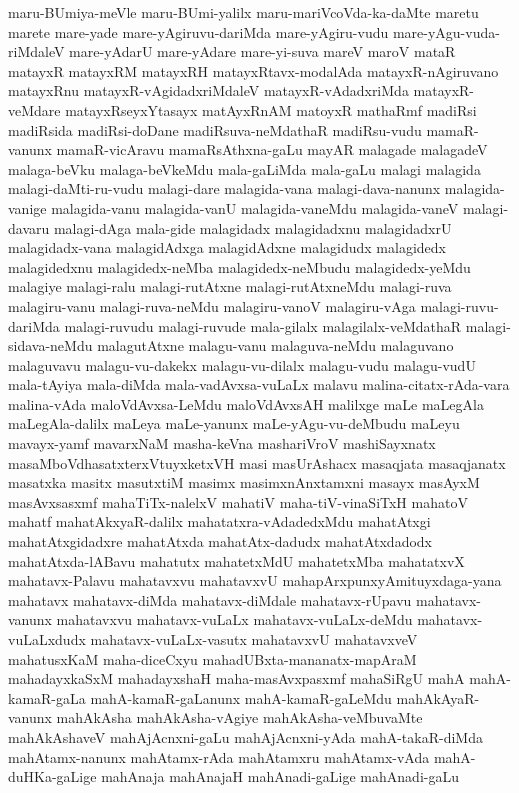 {maru-BUmiya-meVle
maru-BUmi-yalilx
maru-mariVcoVda-ka-daMte
maretu
marete
mare-yade
mare-yAgiruvu-dariMda
mare-yAgiru-vudu
mare-yAgu-vuda-riMdaleV
mare-yAdarU
mare-yAdare
mare-yi-suva
mareV
maroV
mataR
matayxR
matayxRM
matayxRH
matayxRtavx-modalAda
matayxR-nAgiruvano
matayxRnu
matayxR-vAgidadxriMdaleV
matayxR-vAdadxriMda
matayxR-veMdare
matayxRseyxYtasayx
matAyxRnAM
matoyxR
mathaRmf
madiRsi
madiRsida
madiRsi-doDane
madiRsuva-neMdathaR
madiRsu-vudu
mamaR-vanunx
mamaR-vicAravu
mamaRsAthxna-gaLu
mayAR
malagade
malagadeV
malaga-beVku
malaga-beVkeMdu
mala-gaLiMda
mala-gaLu
malagi
malagida
malagi-daMti-ru-vudu
malagi-dare
malagida-vana
malagi-dava-nanunx
malagida-vanige
malagida-vanu
malagida-vanU
malagida-vaneMdu
malagida-vaneV
malagi-davaru
malagi-dAga
mala-gide
malagidadx
malagidadxnu
malagidadxrU
malagidadx-vana
malagidAdxga
malagidAdxne
malagidudx
malagidedx
malagidedxnu
malagidedx-neMba
malagidedx-neMbudu
malagidedx-yeMdu
malagiye
malagi-ralu
malagi-rutAtxne
malagi-rutAtxneMdu
malagi-ruva
malagiru-vanu
malagi-ruva-neMdu
malagiru-vanoV
malagiru-vAga
malagi-ruvu-dariMda
malagi-ruvudu
malagi-ruvude
mala-gilalx
malagilalx-veMdathaR
malagi-sidava-neMdu
malagutAtxne
malagu-vanu
malaguva-neMdu
malaguvano
malaguvavu
malagu-vu-dakekx
malagu-vu-dilalx
malagu-vudu
malagu-vudU
mala-tAyiya
mala-diMda
mala-vadAvxsa-vuLaLx
malavu
malina-citatx-rAda-vara
malina-vAda
maloVdAvxsa-LeMdu
maloVdAvxsAH
malilxge
maLe
maLegAla
maLegAla-dalilx
maLeya
maLe-yanunx
maLe-yAgu-vu-deMbudu
maLeyu
mavayx-yamf
mavarxNaM
masha-keVna
mashariVroV
mashiSayxnatx
masaMboVdhasatxterxVtuyxketxVH
masi
masUrAshacx
masaqjata
masaqjanatx
masatxka
masitx
masutxtiM
masimx
masimxnAnxtamxni
masayx
masAyxM
masAvxsasxmf
mahaTiTx-nalelxV
mahatiV
maha-tiV-vinaSiTxH
mahatoV
mahatf
mahatAkxyaR-dalilx
mahatatxra-vAdadedxMdu
mahatAtxgi
mahatAtxgidadxre
mahatAtxda
mahatAtx-dadudx
mahatAtxdadodx
mahatAtxda-lABavu
mahatutx
mahatetxMdU
mahatetxMba
mahatatxvX
mahatavx-Palavu
mahatavxvu
mahatavxvU
mahapArxpunxyAmituyxdaga-yana
mahatavx
mahatavx-diMda
mahatavx-diMdale
mahatavx-rUpavu
mahatavx-vanunx
mahatavxvu
mahatavx-vuLaLx
mahatavx-vuLaLx-deMdu
mahatavx-vuLaLxdudx
mahatavx-vuLaLx-vasutx
mahatavxvU
mahatavxveV
mahatusxKaM
maha-diceCxyu
mahadUBxta-mananatx-mapAraM
mahadayxkaSxM
mahadayxshaH
maha-masAvxpasxmf
mahaSiRgU
mahA
mahA-kamaR-gaLa
mahA-kamaR-gaLanunx
mahA-kamaR-gaLeMdu
mahAkAyaR-vanunx
mahAkAsha
mahAkAsha-vAgiye
mahAkAsha-veMbuvaMte
mahAkAshaveV
mahAjAcnxni-gaLu
mahAjAcnxni-yAda
mahA-takaR-diMda
mahAtamx-nanunx
mahAtamx-rAda
mahAtamxru
mahAtamx-vAda
mahA-duHKa-gaLige
mahAnaja
mahAnajaH
mahAnadi-gaLige
mahAnadi-gaLu
}
